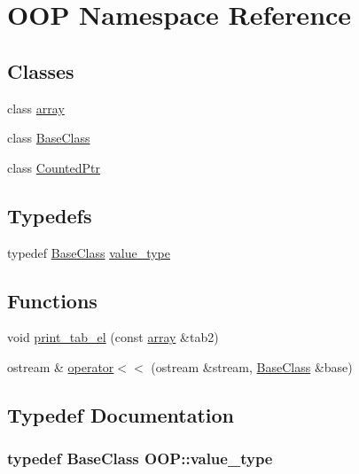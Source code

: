\hypertarget{namespaceOOP}{\section{\-O\-O\-P \-Namespace \-Reference}
\label{namespaceOOP}
}
\subsection*{\-Classes}
\begin{DoxyCompactItemize}
\item 
class \hyperlink{classOOP_1_1array}{array}
\item 
class \hyperlink{classOOP_1_1BaseClass}{\-Base\-Class}
\item 
class \hyperlink{classOOP_1_1CountedPtr}{\-Counted\-Ptr}
\end{DoxyCompactItemize}
\subsection*{\-Typedefs}
\begin{DoxyCompactItemize}
\item 
typedef \hyperlink{classOOP_1_1BaseClass}{\-Base\-Class} \hyperlink{namespaceOOP_a98bf9fa44d8f36499284c9d57c1958aa}{value\-\_\-type}
\end{DoxyCompactItemize}
\subsection*{\-Functions}
\begin{DoxyCompactItemize}
\item 
void \hyperlink{namespaceOOP_a32e75bb4328dbb5e86e98a8af0a5cf61}{print\-\_\-tab\-\_\-el} (const \hyperlink{classOOP_1_1array}{array} \&tab2)
\item 
ostream \& \hyperlink{namespaceOOP_a3f50dd68985954d3519768fe0da14797}{operator$<$$<$} (ostream \&stream, \hyperlink{classOOP_1_1BaseClass}{\-Base\-Class} \&base)
\end{DoxyCompactItemize}


\subsection{\-Typedef \-Documentation}
\hypertarget{namespaceOOP_a98bf9fa44d8f36499284c9d57c1958aa}{
\subsubsection[{value\-\_\-type}]{\setlength{\rightskip}{0pt plus 5cm}typedef {\bf \-Base\-Class} {\bf \-O\-O\-P\-::value\-\_\-type}}}\label{namespaceOOP_a98bf9fa44d8f36499284c9d57c1958aa}


